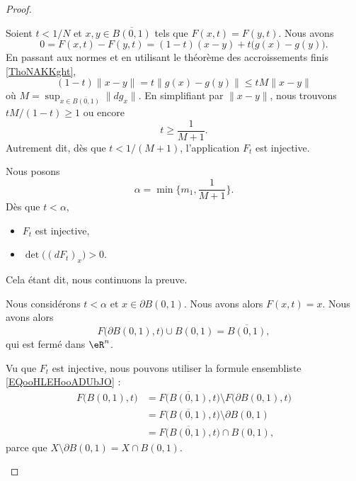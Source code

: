 \begin{proof}
\begin{subproof}
		Soient \( t<1/N\) et \( x,y\in\overline{B(0,1)}\) tels que \( F(x,t)=F(y,t)\). Nous avons
		\begin{equation}
			0=F(x,t)-F(y,t)=(1-t)(x-y)+t\big( g(x)-g(y) \big).
		\end{equation}
		En passant aux normes et en utilisant le théorème des accroissements finis \ref{ThoNAKKght},
		\begin{equation}
			(1-t)\| x-y \|=t\| g(x)-g(y) \|\leq tM\| x-y \|
		\end{equation}
		où \( M=\sup_{x\in \overline{B(0,1)}}\| dg_x \|\). En simplifiant par \( \| x-y \|\), nous trouvons \( tM/(1-t)\geq 1\) ou encore
		\begin{equation}
			t\geq \frac{1}{ M+1}.
		\end{equation}
		Autrement dit, dès que \( t<1/(M+1)\), l'application \( F_t\) est injective.


		Nous posons
		\begin{equation}
			\alpha=\min\{ m_1, \frac{1}{ M+1} \}.
		\end{equation}
		Dès que \( t<\alpha\),
		\begin{itemize}
			\item
			      \( F_t\) est injective,
			\item
			      \( \det\Big( (dF_t)_x \Big)>0\).
		\end{itemize}
		Cela étant dit, nous continuons la preuve.


		Nous considérons \( t<\alpha\) et \( x\in\partial B(0,1)\). Nous avons alors \( F(x,t)=x\). Nous avons alors
		\begin{equation}
			F\big( \partial B(0,1),t \big)\cup B(0,1)=\overline{B(0,1)},
		\end{equation}
		qui est fermé dans \( \eR^n\).

		Vu que \( F_t\) est injective, nous pouvons utiliser la formule ensembliste \eqref{EQooHLEHooADUbJO} :
		\begin{subequations}		\label{SUBEQSooLWJLooBEVkro}
			\begin{align}
				F\big( B(0,1), t \big) & =F\big( \overline{B(0,1)}, t \big)\setminus F\big( \partial B(0,1), t \big) \\
				                       & =F\big( \overline{B(0,1)}, t \big)\setminus \partial B(0,1)                 \\
				                       & =F\big( \overline{B(0,1)}, t \big)\cap  B(0,1),
			\end{align}
		\end{subequations}
		parce que \( X\setminus \partial B(0,1)=X\cap B(0,1)\).


\end{subproof}
\end{proof}
